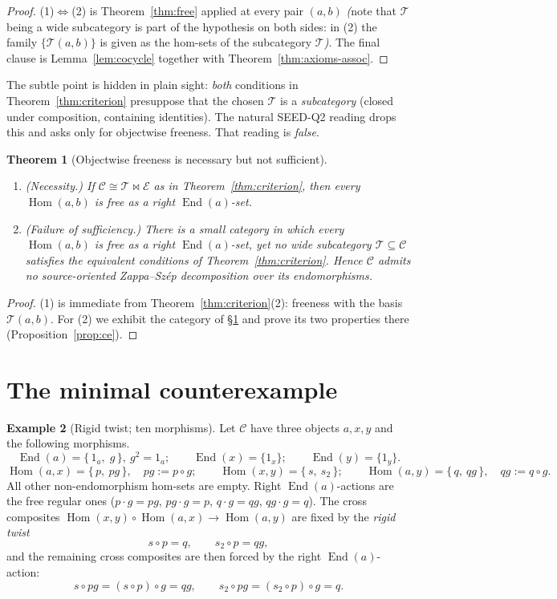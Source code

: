 \documentclass[11pt]{article}
\newtheorem{theorem}{Theorem}
\theoremstyle{definition}
\newtheorem{example}[theorem]{Example}
\newcommand{\Hom}{\operatorname{Hom}}
\newcommand{\End}{\operatorname{End}}
\newcommand{\C}{\mathcal{C}}
\newcommand{\T}{\mathcal{T}}
\newcommand{\E}{\mathcal{E}}
\begin{document}
\begin{proof}
(1)$\Leftrightarrow$(2) is Theorem~\ref{thm:free} applied at every pair $(a,b)$
\emph{(}note that $\T$ being a wide subcategory is part of the hypothesis on both
sides: in (2) the family $\{\T(a,b)\}$ is given as the hom-sets of the
subcategory $\T$\emph{)}. The final clause is Lemma~\ref{lem:cocycle} together
with Theorem~\ref{thm:axioms-assoc}.
\end{proof}

The subtle point is hidden in plain sight: \emph{both} conditions in
Theorem~\ref{thm:criterion} presuppose that the chosen $\T$ is a
\emph{subcategory} (closed under composition, containing identities). The natural
SEED-Q2 reading drops this and asks only for objectwise freeness. That reading is
\emph{false}.

\begin{theorem}[Objectwise freeness is necessary but not sufficient]\label{thm:notsuff}
\leavevmode
\begin{enumerate}
\item \emph{(Necessity.)} If $\C\cong\T\bowtie\E$ as in
Theorem~\ref{thm:criterion}, then every $\Hom(a,b)$ is free as a right
$\End(a)$-set.
\item \emph{(Failure of sufficiency.)} There is a small category in which every
$\Hom(a,b)$ is free as a right $\End(a)$-set, yet \emph{no} wide subcategory
$\T\subseteq\C$ satisfies the equivalent conditions of
Theorem~\ref{thm:criterion}. Hence $\C$ admits no source-oriented Zappa--Sz\'ep
decomposition over its endomorphisms.
\end{enumerate}
\end{theorem}

\begin{proof}
(1) is immediate from Theorem~\ref{thm:criterion}(2): freeness with the basis
$\T(a,b)$. For (2) we exhibit the category of \S\ref{sec:ce} and prove its two
properties there (Proposition~\ref{prop:ce}).
\end{proof}

\section{The minimal counterexample}\label{sec:ce}

\begin{example}[Rigid twist; ten morphisms]\label{ex:ce}
Let $\C$ have three objects $a,x,y$ and the following morphisms.
\[
  \End(a)=\{\,1_a,\;g\,\},\ g^2=1_a;\qquad \End(x)=\{1_x\};\qquad \End(y)=\{1_y\}.
\]
\[
  \Hom(a,x)=\{\,p,\ pg\,\},\quad pg:=p\circ g; \qquad
  \Hom(x,y)=\{\,s,\ s_2\,\}; \qquad
  \Hom(a,y)=\{\,q,\ qg\,\},\quad qg:=q\circ g.
\]
All other non-endomorphism hom-sets are empty. Right $\End(a)$-actions are the
free regular ones ($p\cdot g=pg$, $pg\cdot g=p$, $q\cdot g=qg$, $qg\cdot g=q$).
The cross composites $\Hom(x,y)\circ\Hom(a,x)\to\Hom(a,y)$ are fixed by the
\emph{rigid twist}
\[
  s\circ p=q,\qquad s_2\circ p=qg,
\]
and the remaining cross composites are then forced by the right $\End(a)$-action:
\[
  s\circ pg=(s\circ p)\circ g=qg,\qquad s_2\circ pg=(s_2\circ p)\circ g=q .
\]
\end{example}
\end{document}
